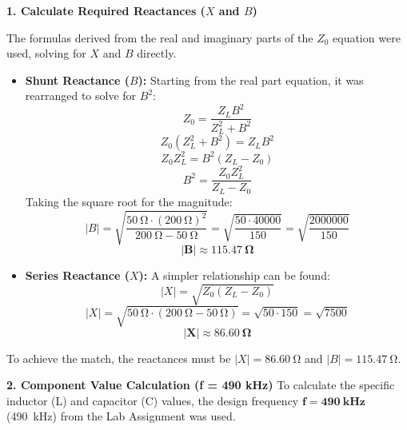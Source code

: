 \textbf{1. Calculate Required Reactances ($X$ and $B$)}

The formulas derived from the real and imaginary parts of the $Z_{0}$ equation were used, solving for $X$ and $B$ directly.

\begin{itemize}
    \item \textbf{Shunt Reactance ($B$):}
    Starting from the real part equation, it was rearranged to solve for $B^2$:
    \begin{equation}
        Z_{0} = \frac{Z_L B^2}{Z_L^2 + B^2}
    \end{equation}
    \begin{equation}
        Z_{0} (Z_L^2 + B^2) = Z_L B^2
    \end{equation}
    \begin{equation}
        Z_{0} Z_L^2 = B^2 (Z_L - Z_{0})
    \end{equation}
    \begin{equation}
        B^2 = \frac{Z_{0} Z_L^2}{Z_L - Z_{0}}
    \end{equation}
    Taking the square root for the magnitude:
    \begin{equation}
        |B| = \sqrt{\frac{\SI{50}{\ohm} \cdot (\SI{200}{\ohm})^2}{\SI{200}{\ohm} - \SI{50}{\ohm}}} = \sqrt{\frac{50 \cdot 40000}{150}} = \sqrt{\frac{2000000}{150}}
    \end{equation}
    \begin{equation}
        \mathbf{|B| \approx \SI{115.47}{\ohm}}
    \end{equation}

    \item \textbf{Series Reactance ($X$):}
    A simpler relationship can be found:
    \begin{equation}
        |X| = \sqrt{Z_{0} (Z_L - Z_{0})}
    \end{equation}
    \begin{equation}
        |X| = \sqrt{\SI{50}{\ohm} \cdot (\SI{200}{\ohm} - \SI{50}{\ohm})} = \sqrt{50 \cdot 150} = \sqrt{7500}
    \end{equation}
    \begin{equation}
        \mathbf{|X| \approx \SI{86.60}{\ohm}}
    \end{equation}
\end{itemize}

To achieve the match, the reactances must be $|X| = \SI{86.60}{\ohm}$ and $|B| = \SI{115.47}{\ohm}$.

\textbf{2. Component Value Calculation (f = 490 kHz)}
To calculate the specific inductor (L) and capacitor (C) values, the design frequency $\mathbf{f = \SI{490}{\kilo\hertz}}$ (\SI{490}{\kilo\hertz}) from the Lab Assignment was used.

